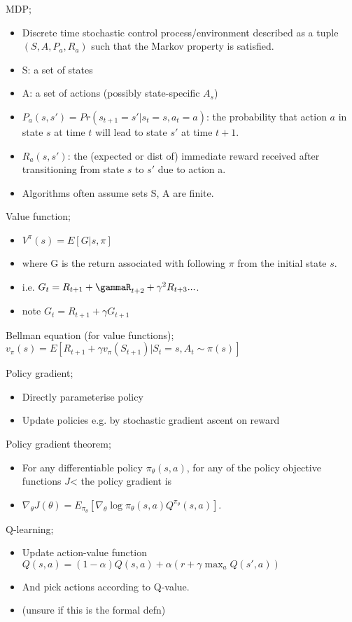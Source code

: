 \documentclass{article}
\begin{document}
MDP; \begin{itemize} \item Discrete time stochastic control process/environment described as a tuple $(S, A, P_a, R_a)$ such that the Markov property is satisfied. \item S: a set of states \item A: a set of actions (possibly state-specific $A_s$) \item $P_a(s,s')=Pr(s_{t+1}=s'|s_t=s, a_t=a)$: the probability that action $a$ in state $s$ at time $t$ will lead to state $s'$ at time $t+1$. \item $R_a(s,s')$: the (expected or dist of) immediate reward received after transitioning from state $s$ to $s'$ due to action a. \item Algorithms often assume sets S, A are finite. \end{itemize}

Value function; \begin{itemize} \item $V^\pi(s) = E[G|s, \pi]$ \item where G is the return associated with following $\pi$ from the initial state $s$. \item i.e. $G_t=R_{t+1}+\gammaR_{t+2}+\gamma^2R_{t+3}...$. \item note $G_t=R_{t+1}+\gamma G_{t+1}$ \end{itemize}

Bellman equation (for value functions); $v_\pi(s)=E[R_{t+1}+\gamma v_{\pi}(S_{t+1})|S_t=s, A_t\sim \pi(s)]$

Policy gradient; \begin{itemize} \item Directly parameterise policy \item Update policies e.g. by stochastic gradient ascent on reward \end{itemize}

Policy gradient theorem; \begin{itemize} \item For any differentiable policy $\pi_\theta(s, a)$, for any of the policy objective functions $J$< the policy gradient is \item $\nabla_\theta J(\theta) = E_{\pi_\theta}[\nabla_\theta\log \pi_\theta(s, a)Q^{\pi_\theta}(s,a)]$. \end{itemize}

Q-learning; \begin{itemize} \item Update action-value function $Q(s, a)=(1-\alpha)Q(s,a)+\alpha(r+\gamma\max_a Q(s', a))$ \item And pick actions according to Q-value. \item (unsure if this is the formal defn) \end{itemize}
\end{document}

